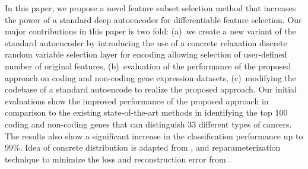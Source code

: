 In this paper, we propose a novel feature subset selection method that increases the power of a standard deep autoencoder for differentiable feature selection. 
Our major contributions in this paper is two fold: (a)~we create a new variant of the standard autoencoder by introducing the use of a concrete relaxation discrete random variable selection layer for encoding allowing selection of user-defined number of original features, (b)~evaluation of the performance of the proposed approach on coding and non-coding gene expression datasets, (c)~modifying the codebase of a standard autoencode to realize the proposed approach. Our initial evaluations show the improved performance of the proposed approach in comparison to the existing state-of-the-art methods in identifying the top 100 coding and non-coding genes that can distinguish 33 different types of cancers.
The results also show a significant increase in the classification performance up to 99\%.
Idea of concrete distribution is adapted from \cite{maddison2016concrete, kingma2013auto}, and reparameterization technique to minimize the loss and reconstruction error from \cite{abid2019concrete}.

